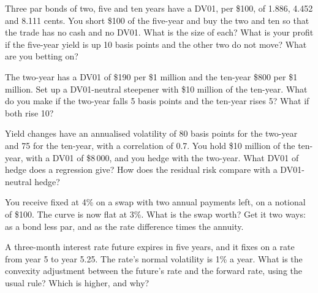 \begin{question}\label{iq:iv2:rates-and-fx:17}
Three par bonds of two, five and ten years have a DV01, per \$100, of 1.886, 4.452 and 8.111 cents. You short \$100 of the five-year and buy the two and ten so that the trade has no cash and no DV01. What is the size of each? What is your profit if the five-year yield is up 10 basis points and the other two do not move? What are you betting on?
\end{question}

\begin{question}\label{iq:iv2:rates-and-fx:18}
The two-year has a DV01 of \$190 per \$1 million and the ten-year \$800 per \$1 million. Set up a DV01-neutral steepener with \$10 million of the ten-year. What do you make if the two-year falls 5 basis points and the ten-year rises 5? What if both rise 10?
\end{question}

\begin{question}\label{iq:iv2:rates-and-fx:19}
Yield changes have an annualised volatility of 80 basis points for the two-year and 75 for the ten-year, with a correlation of 0.7. You hold \$10 million of the ten-year, with a DV01 of \$8\,000, and you hedge with the two-year. What DV01 of hedge does a regression give? How does the residual risk compare with a DV01-neutral hedge?
\end{question}

\begin{question}\label{iq:iv2:rates-and-fx:20}
You receive fixed at 4\% on a swap with two annual payments left, on a notional of \$100. The curve is now flat at 3\%. What is the swap worth? Get it two ways: as a bond less par, and as the rate difference times the annuity.
\end{question}

\begin{question}\label{iq:iv2:rates-and-fx:21}
A three-month interest rate future expires in five years, and it fixes on a rate from year 5 to year 5.25. The rate's normal volatility is 1\% a year. What is the convexity adjustment between the future's rate and the forward rate, using the usual rule? Which is higher, and why?
\end{question}

